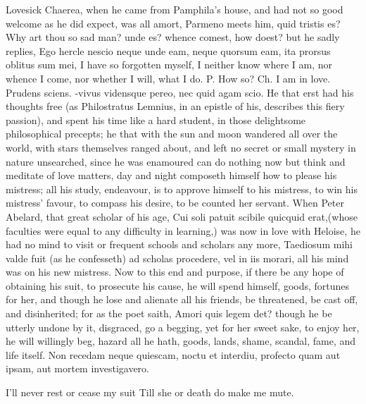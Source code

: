 {Lovesick Chaerea, when he came from Pamphila's house, and had not
so good welcome as he did expect, was all amort, Parmeno meets him,
quid tristis es? Why art thou so sad man? unde es? whence comest, how
doest? but he sadly replies, Ego hercle nescio neque unde eam, neque
quorsum eam, ita prorsus oblitus sum mei, I have so forgotten myself, I
neither know where I am, nor whence I come, nor whether I will, what I
do. P. How so? Ch. I am in love. Prudens sciens. -vivus
vidensque pereo, nec quid agam scio. He that erst had his
thoughts free (as Philostratus Lemnius, in an epistle of his, describes
this fiery passion), and spent his time like a hard student, in those
delightsome philosophical precepts; he that with the sun and moon
wandered all over the world, with stars themselves ranged about, and
left no secret or small mystery in nature unsearched, since he was
enamoured can do nothing now but think and meditate of love matters,
day and night composeth himself how to please his mistress; all his
study, endeavour, is to approve himself to his mistress, to win his
mistress' favour, to compass his desire, to be counted her servant.
When Peter Abelard, that great scholar of his age, Cui soli patuit
scibile quicquid erat,(whose faculties were equal to any
difficulty in learning,) was now in love with Heloise, he had no mind
to visit or frequent schools and scholars any more, Taediosum mihi
valde fuit (as he confesseth) ad scholas procedere, vel in iis
morari, all his mind was on his new mistress.
Now to this end and purpose, if there be any hope of obtaining his
suit, to prosecute his cause, he will spend himself, goods, fortunes
for her, and though he lose and alienate all his friends, be
threatened, be cast off, and disinherited; for as the poet saith, Amori
quis legem det? though he be utterly undone by it, disgraced, go
a begging, yet for her sweet sake, to enjoy her, he will willingly beg,
hazard all he hath, goods, lands, shame, scandal, fame, and life
itself.
Non recedam neque quiescam, noctu et interdiu,
profecto quam aut ipsam, aut mortem investigavero.

I'll never rest or cease my suit
Till she or death do make me mute.

}
